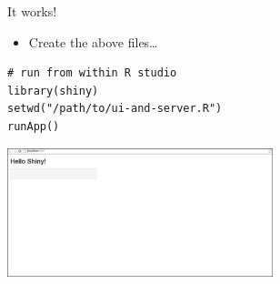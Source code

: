 \documentclass[sans,aspectratio=169,presentation,bigger,fleqn]{beamer}
\begin{document}
\begin{frame}[fragile,label=sec-5]{It works!}
 \begin{itemize}
\item Create the above files\ldots{}
\end{itemize}

\scriptsize
\begin{verbatim}
# run from within R studio
library(shiny)
setwd("/path/to/ui-and-server.R")
runApp()
\end{verbatim}

\begin{center}
\includegraphics[height=3.75cm]{./img/shiny-template.png}
\end{center}
\end{frame}
\end{document}
